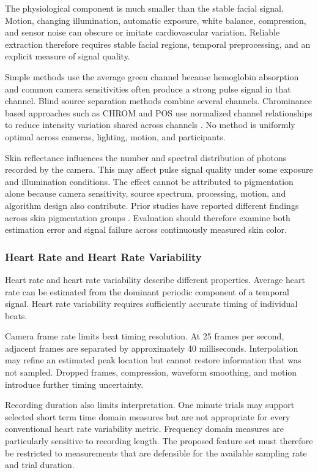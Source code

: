 \documentclass[12pt]{article}
\begin{document}
The physiological component is much smaller than the stable facial signal. Motion, changing illumination, automatic exposure, white balance, compression, and sensor noise can obscure or imitate cardiovascular variation. Reliable extraction therefore requires stable facial regions, temporal preprocessing, and an explicit measure of signal quality.

Simple methods use the average green channel because hemoglobin absorption and common camera sensitivities often produce a strong pulse signal in that channel. Blind source separation methods combine several channels. Chrominance based approaches such as CHROM and POS use normalized channel relationships to reduce intensity variation shared across channels \cite{dehaan2013,wang2017}. No method is uniformly optimal across cameras, lighting, motion, and participants.

Skin reflectance influences the number and spectral distribution of photons recorded by the camera. This may affect pulse signal quality under some exposure and illumination conditions. The effect cannot be attributed to pigmentation alone because camera sensitivity, source spectrum, processing, motion, and algorithm design also contribute. Prior studies have reported different findings across skin pigmentation groups \cite{addison2018,barde2023}. Evaluation should therefore examine both estimation error and signal failure across continuously measured skin color.

\subsubsection{Heart Rate and Heart Rate Variability}

Heart rate and heart rate variability describe different properties. Average heart rate can be estimated from the dominant periodic component of a temporal signal. Heart rate variability requires sufficiently accurate timing of individual beats.

Camera frame rate limits beat timing resolution. At 25 frames per second, adjacent frames are separated by approximately 40 milliseconds. Interpolation may refine an estimated peak location but cannot restore information that was not sampled. Dropped frames, compression, waveform smoothing, and motion introduce further timing uncertainty.

Recording duration also limits interpretation. One minute trials may support selected short term time domain measures but are not appropriate for every conventional heart rate variability metric. Frequency domain measures are particularly sensitive to recording length. The proposed feature set must therefore be restricted to measurements that are defensible for the available sampling rate and trial duration.
\end{document}
